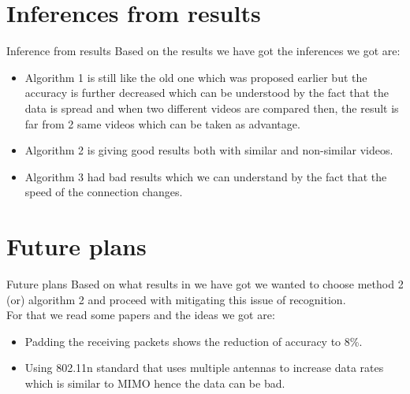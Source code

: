 \documentclass{beamer}
\begin{document}


\section{Inferences from results}
\begin{frame}{Inference from results}
    Based on the results we have got the inferences we got are:
    \begin{itemize}
        \item Algorithm 1 is still like the old one which was proposed earlier but the accuracy is further decreased which can be understood by the fact that the data is spread and when two different videos are compared then, the result is far from 2 same videos which can be taken as advantage.
        \item Algorithm 2 is giving good results both with similar and non-similar videos.
        \item Algorithm 3 had bad results which we can understand by the fact that the speed of the connection changes.
    \end{itemize}
\end{frame}



\section{Future plans}
\begin{frame}{Future plans}
    Based on what results in we have got we wanted to choose method 2 (or) algorithm 2 and proceed with mitigating this issue of recognition.  \\ \vspace{1em} For that we read some papers and the ideas we got are:
    \begin{itemize}
        \item Padding the receiving packets shows the reduction of accuracy to 8\%.
        \item Using 802.11n standard that uses multiple antennas to increase data rates which is similar to MIMO hence the data can be bad.
    \end{itemize} 
\end{frame}
\end{document}
